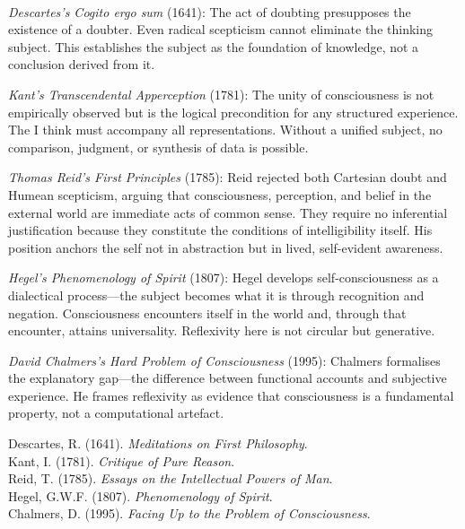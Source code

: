 \begin{technical}
\\[0.1em]
\textit{Descartes's Cogito ergo sum} (1641): The act of doubting presupposes the existence of a doubter. Even radical scepticism cannot eliminate the thinking subject. This establishes the subject as the foundation of knowledge, not a conclusion derived from it.

\textit{Kant's Transcendental Apperception} (1781): The unity of consciousness is not empirically observed but is the logical precondition for any structured experience. The \QSOpen{}I think\QSClose{} must accompany all representations. Without a unified subject, no comparison, judgment, or synthesis of data is possible.

\textit{Thomas Reid's First Principles} (1785): Reid rejected both Cartesian doubt and Humean scepticism, arguing that consciousness, perception, and belief in the external world are immediate acts of common sense. They require no inferential justification because they constitute the conditions of intelligibility itself. His position anchors the self not in abstraction but in lived, self-evident awareness.

\textit{Hegel's Phenomenology of Spirit} (1807): Hegel develops self-consciousness as a dialectical process—the subject becomes what it is through recognition and negation. Consciousness encounters itself in the world and, through that encounter, attains universality. Reflexivity here is not circular but generative.

\textit{David Chalmers's Hard Problem of Consciousness} (1995): Chalmers formalises the explanatory gap—the difference between functional accounts and subjective experience. He frames reflexivity as evidence that consciousness is a fundamental property, not a computational artefact.

\techref
{\footnotesize
Descartes, R. (1641). \textit{Meditations on First Philosophy}.\\
Kant, I. (1781). \textit{Critique of Pure Reason}.\\
Reid, T. (1785). \textit{Essays on the Intellectual Powers of Man}.\\
Hegel, G.W.F. (1807). \textit{Phenomenology of Spirit}.\\
Chalmers, D. (1995). \textit{Facing Up to the Problem of Consciousness}.
}
\end{technical}